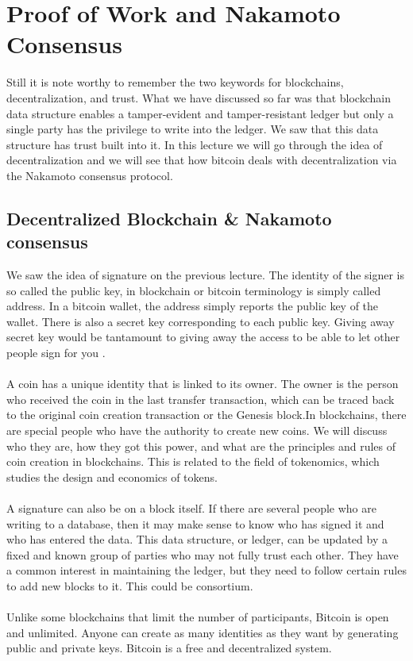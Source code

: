 \chapter{Proof of Work and Nakamoto Consensus}
Still it is note worthy to remember the two keywords for blockchains, decentralization, and trust. What we have discussed so far was that blockchain data structure enables a tamper-evident and tamper-resistant ledger but only a single party has the privilege to write into the ledger. We saw that this data structure has trust built into it. In this lecture we will go through the idea of decentralization and we will see that how bitcoin deals with decentralization via the Nakamoto consensus protocol.

\section{Decentralized Blockchain \& Nakamoto consensus}
We saw the idea of signature on the previous lecture. The identity of the signer is so called the public key, in blockchain or bitcoin terminology is simply called address. In a bitcoin wallet, the address simply reports the public key of the wallet. There is also a secret key corresponding to each public key. Giving away secret key would be tantamount to giving away the access to be able to let other people sign for you .\\\\
A coin has a unique identity that is linked to its owner. The owner is the person who received the coin in the last transfer transaction, which can be traced back to the original coin creation transaction or the Genesis block.In blockchains, there are special people who have the authority to create new coins. We will discuss who they are, how they got this power, and what are the principles and rules of coin creation in blockchains. This is related to the field of tokenomics, which studies the design and economics of tokens.\\\\
A signature can also be on a block itself.  If there are several people who are writing to a database, then it may make sense to know who has signed it and who has entered the data. This data structure, or ledger, can be updated by a fixed and known group of parties who may not fully trust each other. They have a common interest in maintaining the ledger, but they need to follow certain rules to add new blocks to it. This could be consortium. \\\\
Unlike some blockchains that limit the number of participants, Bitcoin is open and unlimited. Anyone can create as many identities as they want by generating public and private keys. Bitcoin is a free and decentralized system.

